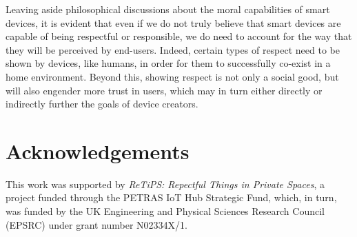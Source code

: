 \documentclass{IETpaper}
\begin{document}
Leaving aside philosophical discussions about the moral capabilities of smart devices, it is evident that even if we do not truly believe that smart devices are capable of being respectful or responsible, we do need to account for the way that they will be perceived by end-users. Indeed, certain types of respect need to be shown by devices, like humans, in order for them to successfully co-exist in a home environment. Beyond this, showing respect is not only a social good, but will also engender more trust in users, which may in turn either directly or indirectly further the goals of device creators.




\section*{Acknowledgements}
This work was supported by \emph{ReTiPS: Repectful Things in Private Spaces}, a project funded through the PETRAS IoT Hub Strategic Fund, which, in turn, was funded by the UK Engineering and Physical Sciences Research Council (EPSRC) under grant number N02334X/1.





\end{document}
